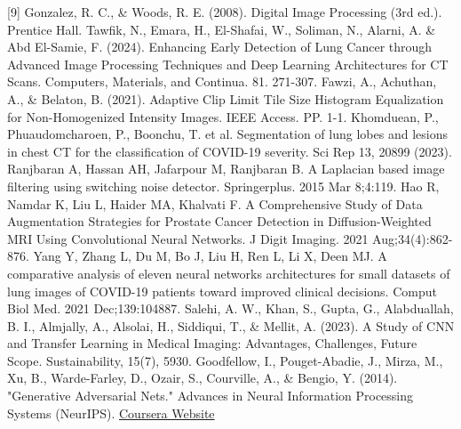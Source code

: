 \documentclass[a4paper, twocolumn, 11pt]{article}
\begin{document}
[9] Gonzalez, R. C., \& Woods, R. E. (2008). Digital Image Processing (3rd ed.). Prentice Hall. \newline
[10] Tawfik, N., Emara, H., El-Shafai, W., Soliman, N., Alarni, A. \& Abd El-Samie, F. (2024). Enhancing Early Detection of Lung Cancer through Advanced Image Processing Techniques and Deep Learning Architectures for CT Scans. Computers, Materials, and Continua. 81. 271-307. \newline
[11] Fawzi, A., Achuthan, A., \& Belaton, B. (2021). Adaptive Clip Limit Tile Size Histogram Equalization for Non-Homogenized Intensity Images. IEEE Access. PP. 1-1. \newline
[12] Khomduean, P., Phuaudomcharoen, P., Boonchu, T. et al. Segmentation of lung lobes and lesions in chest CT for the classification of COVID-19 severity. Sci Rep 13, 20899 (2023). \newline
[13] Ranjbaran A, Hassan AH, Jafarpour M, Ranjbaran B. A Laplacian based image filtering using switching noise detector. Springerplus. 2015 Mar 8;4:119. \newline
[14] Hao R, Namdar K, Liu L, Haider MA, Khalvati F. A Comprehensive Study of Data Augmentation Strategies for Prostate Cancer Detection in Diffusion-Weighted MRI Using Convolutional Neural Networks. J Digit Imaging. 2021 Aug;34(4):862-876. \newline
[15] Yang Y, Zhang L, Du M, Bo J, Liu H, Ren L, Li X, Deen MJ. A comparative analysis of eleven neural networks architectures for small datasets of lung images of COVID-19 patients toward improved clinical decisions. Comput Biol Med. 2021 Dec;139:104887. \newline
[16] Salehi, A. W., Khan, S., Gupta, G., Alabduallah, B. I., Almjally, A., Alsolai, H., Siddiqui, T., \& Mellit, A. (2023). A Study of CNN and Transfer Learning in Medical Imaging: Advantages, Challenges, Future Scope. Sustainability, 15(7), 5930. \newline
[17] Goodfellow, I., Pouget-Abadie, J., Mirza, M., Xu, B., Warde-Farley, D., Ozair, S., Courville, A., \& Bengio, Y. (2014). "Generative Adversarial Nets." Advances in Neural Information Processing Systems (NeurIPS). \newline
[18] \href{https://www.coursera.org/articles/conditional-generative-adversarial-network}{Coursera Website}
\end{document}
